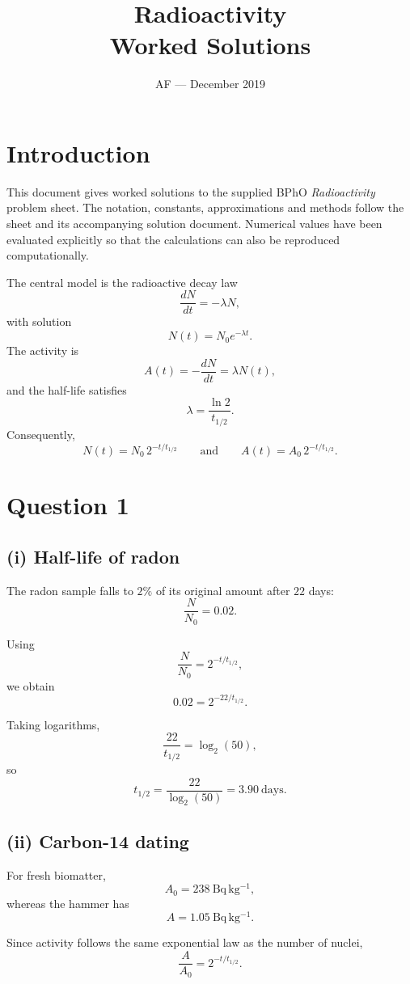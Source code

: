 \documentclass[11pt,a4paper]{article}
\title{\textbf{Radioactivity}\\Worked Solutions}
\author{AF --- December 2019}
\date{}
\begin{document}
\maketitle

\section*{Introduction}

This document gives worked solutions to the supplied BPhO
\emph{Radioactivity} problem sheet. The notation, constants, approximations and
methods follow the sheet and its accompanying solution document. Numerical
values have been evaluated explicitly so that the calculations can also be
reproduced computationally.

The central model is the radioactive decay law
\[
\frac{dN}{dt}=-\lambda N,
\]
with solution
\[
N(t)=N_0e^{-\lambda t}.
\]
The activity is
\[
A(t)=-\frac{dN}{dt}=\lambda N(t),
\]
and the half-life satisfies
\[
\boxed{\lambda=\frac{\ln 2}{t_{1/2}}}.
\]
Consequently,
\[
\boxed{N(t)=N_0\,2^{-t/t_{1/2}}}
\qquad\text{and}\qquad
\boxed{A(t)=A_0\,2^{-t/t_{1/2}}}.
\]

\section{Question 1}

\subsection{(i) Half-life of radon}

The radon sample falls to $2\%$ of its original amount after $22$ days:
\[
\frac{N}{N_0}=0.02.
\]

Using
\[
\frac{N}{N_0}=2^{-t/t_{1/2}},
\]
we obtain
\[
0.02=2^{-22/t_{1/2}}.
\]

Taking logarithms,
\[
\frac{22}{t_{1/2}}
=
\log_2(50),
\]
so
\[
t_{1/2}
=
\frac{22}{\log_2(50)}
=
\boxed{3.90\ \mathrm{days}}.
\]

\subsection{(ii) Carbon-14 dating}

For fresh biomatter,
\[
A_0=238\ \mathrm{Bq\,kg^{-1}},
\]
whereas the hammer has
\[
A=1.05\ \mathrm{Bq\,kg^{-1}}.
\]

Since activity follows the same exponential law as the number of nuclei,
\[
\frac{A}{A_0}
=
2^{-t/t_{1/2}}.
\]
\end{document}
